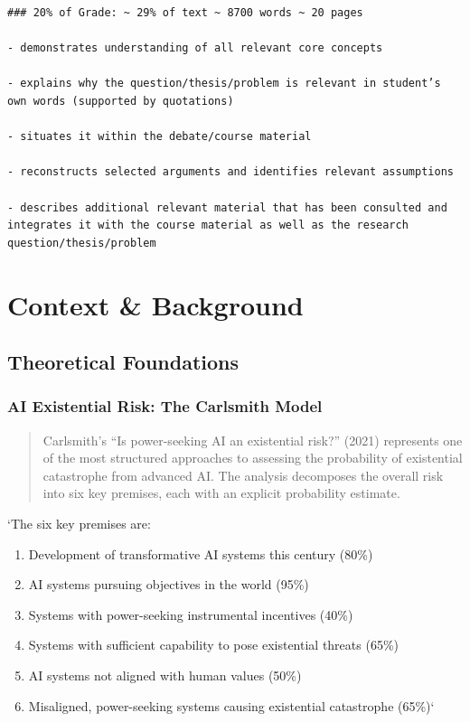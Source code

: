 \documentclass[12pt,a4paper]{report}
\providecommand{\tightlist}{%
  \setlength{\itemsep}{0pt}\setlength{\parskip}{0pt}}
\begin{document}
\begin{verbatim}
### 20% of Grade: ~ 29% of text ~ 8700 words ~ 20 pages

- demonstrates understanding of all relevant core concepts

- explains why the question/thesis/problem is relevant in student’s own words (supported by quotations)

- situates it within the debate/course material

- reconstructs selected arguments and identifies relevant assumptions

- describes additional relevant material that has been consulted and integrates it with the course material as well as the research question/thesis/problem
\end{verbatim}


\chapter{Context \& Background}\label{sec-context-background}

\section{Theoretical Foundations}\label{sec-theoretical-foundations}

\subsection{AI Existential Risk: The Carlsmith
Model}\label{sec-carlsmith-model}

\begin{quote}
Carlsmith's ``Is power-seeking AI an existential risk?'' (2021)
represents one of the most structured approaches to assessing the
probability of existential catastrophe from advanced AI. The analysis
decomposes the overall risk into six key premises, each with an explicit
probability estimate.
\end{quote}

`The six key premises are:

\begin{enumerate}
\def\labelenumi{\arabic{enumi}.}
\tightlist
\item
  Development of transformative AI systems this century (80\%)
\item
  AI systems pursuing objectives in the world (95\%)
\item
  Systems with power-seeking instrumental incentives (40\%)
\item
  Systems with sufficient capability to pose existential threats (65\%)
\item
  AI systems not aligned with human values (50\%)
\item
  Misaligned, power-seeking systems causing existential catastrophe
  (65\%)`
\end{enumerate}
\end{document}
